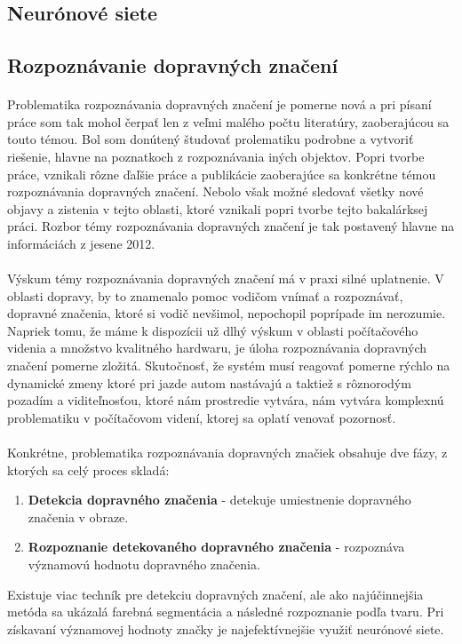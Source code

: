 \documentclass[12pt]{article}
\begin{document}
\subsection{Neurónové siete}
\paragraph{}
\subsection{Rozpoznávanie dopravných značení}
\paragraph{}
Problematika rozpoznávania dopravných značení je pomerne nová a pri písaní práce som tak mohol čerpať len z veľmi malého počtu literatúry, zaoberajúcou sa touto témou.
Bol som donútený študovať prolematiku podrobne a vytvoriť riešenie, hlavne na poznatkoch z rozpoznávania iných objektov.
Popri tvorbe práce, vznikali rôzne ďaľšie práce a publikácie zaoberajúce sa konkrétne témou rozpoznávania dopravných značení.
Nebolo však možné sledovať všetky nové objavy a zistenia v tejto oblasti, ktoré vznikali popri tvorbe tejto bakalárksej práci.
Rozbor témy rozpoznávania dopravných značení je tak postavený hlavne na informáciách z jesene 2012.
\paragraph{}
Výskum témy rozpoznávania dopravných značení má v praxi silné uplatnenie. V oblasti dopravy, by to znamenalo pomoc vodičom vnímať a rozpoznávať, dopravné značenia, ktoré si vodič nevšimol, nepochopil poprípade im nerozumie.
Napriek tomu, že máme k dispozícii už dlhý výskum v oblasti počítačového videnia a množstvo kvalitného hardwaru, je úloha rozpoznávania dopravných značení pomerne zložitá.
Skutočnosť, že systém musí reagovať pomerne rýchlo na dynamické zmeny ktoré pri jazde autom nastávajú a taktiež s rôznorodým pozadím a viditeľnosťou, ktoré nám prostredie vytvára,
nám vytvára komplexnú problematiku v počítačovom videní, ktorej sa oplatí venovať pozornosť.\cite{tfs_pdf}
\paragraph{}
Konkrétne, problematika rozpoznávania dopravných značiek obsahuje dve fázy, z ktorých sa celý proces skladá:
\begin{enumerate}
  \item \textbf{Detekcia dopravného značenia} - detekuje umiestnenie dopravného značenia v obraze.
  \item \textbf{Rozpoznanie detekovaného dopravného značenia} - rozpoznáva významovú hodnotu dopravného značenia.
\end{enumerate} 
Existuje viac techník pre detekciu dopravných značení, ale ako najúčinnejšia metóda sa ukázalá farebná segmentácia a následné rozpoznanie podľa tvaru.
Pri získavaní významovej hodnoty značky je najefektívnejšie využiť neurónové siete.
\cite{tfs_pdf}
\end{document}
